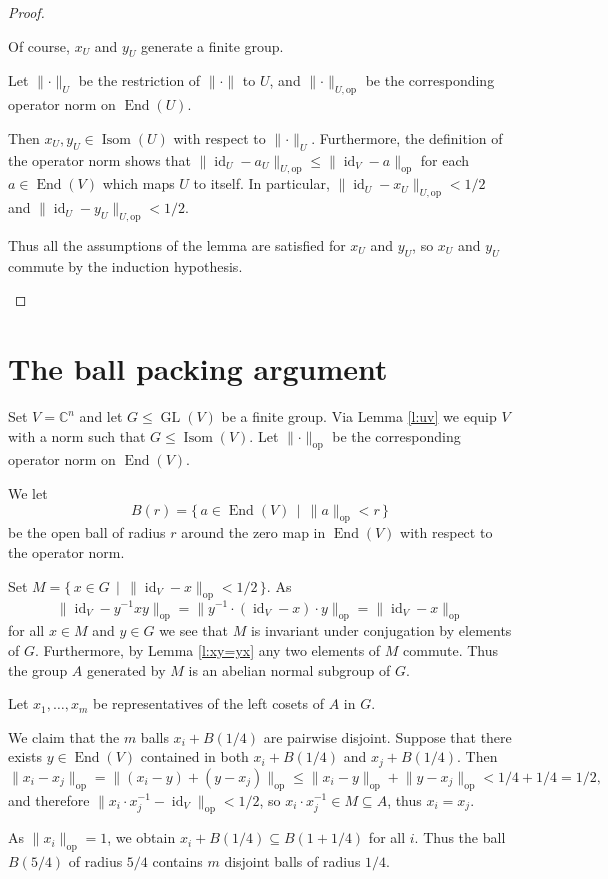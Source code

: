 \documentclass[12pt]{amsart}
\theoremstyle{plain}
\theoremstyle{definition}
\numberwithin{equation}{section}
\newcommand*{\norm}[1]{\lVert#1\rVert}
\newcommand*{\normop}[1]{\lVert#1\rVert_\text{op}}
\newcommand*{\normopU}[1]{\lVert#1\rVert_{U, \text{op}}}
\newcommand*{\defset}[2]{\{\,#1\,\mid\,#2\,\}}
\newcommand*{\CC}{\mathbb C}
\DeclareMathOperator{\id}{id}
\DeclareMathOperator{\GL}{GL}
\DeclareMathOperator{\End}{End}
\DeclareMathOperator{\U}{Isom}
\begin{document}
\begin{proof}
\begin{itemize}
  Of course, $x_U$ and $y_U$ generate a finite group.

  Let $\norm{\cdot}_U$ be the restriction of $\norm{\cdot}$ to $U$,
  and ${\normopU{\cdot}}$ be the corresponding operator norm on
  $\End(U)$.

  Then $x_U, y_U\in\U(U)$ with respect to
  $\norm{\cdot}_U$. Furthermore, the definition of the operator norm
  shows that $\normopU{\id_U-a_U}\le\normop{\id_V-a}$ for each
  $a\in\End(V)$ which maps $U$ to itself. In particular,
  $\normopU{\id_U-x_U}<1/2$ and $\normopU{\id_U-y_U}<1/2$.

  Thus all the assumptions of the lemma are satisfied for $x_U$ and
  $y_U$, so $x_U$ and $y_U$ commute by the induction hypothesis.
\end{itemize}
\end{proof}
\section{The ball packing argument}

Set $V=\CC^n$ and let $G\le\GL(V)$ be a finite group. Via Lemma
\ref{l:uv} we equip $V$ with a norm such that $G\le\U(V)$. Let
$\normop{\cdot}$ be the corresponding operator norm on $\End(V)$.

We let
\[
  B(r)=\defset{a\in\End(V)}{\normop{a}<r}
\]
be the open ball of radius $r$ around the zero map in $\End(V)$ with
respect to the operator norm.

Set $M=\defset{x\in G}{\normop{\id_V-x}<1/2}$. As
\[
  \normop{\id_V-y^{-1}xy}%
=\normop{y^{-1}\cdot(\id_V-x)\cdot y}%
=\normop{\id_V-x}
\]
for all $x\in M$ and $y\in G$ we see that $M$ is invariant under
conjugation by elements of $G$. Furthermore, by Lemma \ref{l:xy=yx}
any two elements of $M$ commute. Thus the group $A$ generated by $M$
is an abelian normal subgroup of $G$.

Let $x_1,\dots,x_m$ be representatives of the left cosets of $A$ in
$G$.

We claim that the $m$ balls $x_i+B(1/4)$ are pairwise
disjoint. Suppose that there exists $y\in\End(V)$ contained in both
$x_i+B(1/4)$ and $x_j+B(1/4)$. Then
\[
  \normop{x_i-x_j}=\normop{(x_i-y)+(y-x_j)}\le\normop{x_i-y}+\normop{y-x_j}
  < 1/4+1/4 = 1/2,
\]
and therefore $\normop{x_i\cdot x_j^{-1}-\id_V}<1/2$, so
$x_i\cdot x_j^{-1}\in M\subseteq A$, thus $x_i=x_j$.

As $\normop{x_i}=1$, we obtain $x_i+B(1/4)\subseteq B(1+1/4)$ for all
$i$. Thus the ball $B(5/4)$ of radius $5/4$ contains $m$ disjoint
balls of radius $1/4$.
\end{document}
